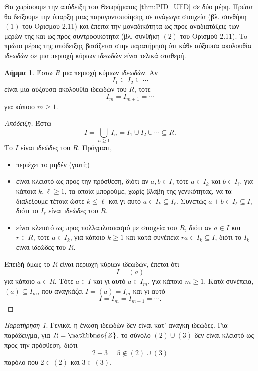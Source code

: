 \documentclass[12pt,a4paper,reqno]{amsart}
\theoremstyle{definition}
\newtheorem{lemma}[theorem]{Λήμμα}
\theoremstyle{remark}
\newtheorem*{remark}{Παρατήρηση}
\numberwithin{theorem}{section}
\numberwithin{exercise}{section}
\numberwithin{equation}{section}
\newcommand{\ZZ}{\mathbbmss{Z}}
\begin{document}
Θα χωρίσουμε την απόδειξη του Θεωρήματος \ref{thm:PID_UFD} σε δύο μέρη. Πρώτα θα δείξουμε την ύπαρξη μιας παραγοντοποίησης σε ανάγωγα στοιχεία (βλ. συνθήκη $(1)$ του Ορισμού 2.11) και έπειτα την μοναδικό\-τητα ως προς αναδιατάξεις των μερών της και ως προς συντροφικό\-τητα (βλ. συνθήκη $(2)$ του Ορισμού 2.11). To πρώτο μέρος της απόδειξης βασίζεται στην παρατήρηση ότι κάθε αύξουσα ακολουθία ιδεωδών σε μια περιοχή κύριων ιδεωδών είναι τελικά σταθερή.
\begin{lemma}
    \label{lem:pid_is_noetherian}
    Έστω $R$ μια περιοχή κύριων ιδεωδών. Αν 
    \[
    I_1 \subseteq I_2 \subseteq \cdots 
    \]
    είναι μια αύξουσα ακολουθία ιδεωδών του $R$, τότε 
    \[
    I_m = I_{m+1} = \cdots 
    \]
    για κάποιο $m \ge 1$.
\end{lemma}
\begin{proof}[Απόδειξη]
    Έστω 
    \[
    I = \bigcup_{n \ge 1} I_n = I_1 \cup I_2 \cup \cdots \subseteq R.
    \]
    Το $I$ είναι ιδεώδες του $R$. Πράγματι,
    \begin{itemize}
        \item περιέχει το μηδέν (γιατί;)
        \item είναι κλειστό ως προς την πρόσθεση, διότι αν $a, b \in I$, τότε $a \in I_k$ και $b \in I_\ell$, για κάποια $k, \ell \ge 1$, τα οποία μπορούμε, χωρίς βλάβη της γενικότητας, να τα διαλέξουμε τέτοια ώστε $k \le \ell$ και γι αυτό $a \in I_k \subseteq I_\ell$. Συνεπώς $a + b \in I_\ell \subseteq I$, διότι το $I_\ell$ είναι ιδεώδες του $R$. 
        \item είναι κλειστό ως προς πολλαπλασιασμό με στοιχεία του $R$, διότι αν $a \in I$ και $r \in R$, τότε $a \in I_k$, για κάποιο $k \ge 1$ και κατά συνέπεια $ra \in I_k \subseteq I$, διότι το $I_k$ είναι ιδεώδες του $R$.
    \end{itemize}

    Επειδή όμως το $R$ είναι περιοχή κύριων ιδεωδών, έπεται ότι 
    \[
    I = (a)
    \]
    για κάποιο $a \in R$. Τότε $a \in I$ και γι αυτό $a \in I_m$, για κάποιο $m \ge 1$. Κατά συνέπεια, $(a) \subseteq I_m$, που αναγκάζει $I = (a) = I_m$ και γι αυτό 
    \[
    I = I_m = I_{m+1} = \cdots.
    \]
\end{proof}

\begin{remark}
    Γενικά, η ένωση ιδεωδών δεν είναι κατ' ανάγκη ιδεώδες. Για παράδειγμα, για $R = \ZZ$, το σύνολο $(2) \cup (3)$ δεν είναι κλειστό ως προς την πρόσθεση, διότι 
    \[
    2 + 3 = 5 \notin (2) \cup (3)
    \]
    παρόλο που $2 \in (2)$ και $3 \in (3)$.
\end{remark}
\end{document}
